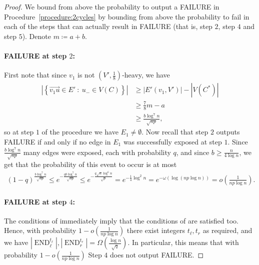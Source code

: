 \documentclass{article}
\DeclareMathOperator{\END}{END}
\begin{document}
	\begin{proof}
		We bound from above the probability to output a FAILURE in Procedure~\ref{procedure:2cycles} by bounding from above the probability to fail in each of the steps that can actually result in  FAILURE (that is, step $2$, step $4$ and step $5$).
		Denote $m \coloneqq a+b$.
		
		\paragraph*{FAILURE at step $2$:} First note that since $v_1$ is not $\left(V', \frac{1}{8} \right)$-heavy, we have
		\begin{align*}
		\left|\left\{\overrightarrow{v_1u} \in E' ~:~ u_- \in V(C) \right\} \right| &\ge \left|E'(v_1, V') \right| - \left|V(C^*) \right| \\
		&\ge \tfrac{7}{8}m - a\\
		&\ge \tfrac{b \log^7 n}{\sqrt{np}},
		\end{align*}
		so at step $1$ of the procedure we have $E_1 \neq \emptyset$.
		Now recall that step $2$ outputs FAILURE if and only if no edge in $E_1$ was successfully exposed at step $1$.
		Since $\frac{b \log^7 n}{\sqrt{np}}$ many edges were exposed, each with probability $q$, and since $b \ge \frac{n}{4\log n}$, we get that the probability of this event to occur is at most
		\begin{align*}
		(1-q)^{\frac{b\log^7 n}{\sqrt{np}}} \le e^{-\frac{qb \log^7 n}{\sqrt{np}}} \le e^{-\frac{q\sqrt{n}\log^6 n}{\sqrt{p}}} = e^{-\frac{1}{4}\log^2 n} = e^{-\omega(\log(np\log n))} = o\left(\tfrac{1}{np\log n} \right).
		\end{align*}	
		
		\paragraph*{FAILURE at step $4$:} The conditions of  immediately imply that the conditions of  are satisfied too.
		Hence, with probability $1 - o\left(\frac{1}{np\log n} \right)$ there exist integers $t_{\ell}, t_r$ as required, and we have $\left|\END_{\ell}^{t_{\ell}} \right|, \left|\END_r^{t_r} \right| = \Omega\left(\frac{\log n}{\sqrt{q}} \right)$.
		In particular, this means that with probability $1 - o\left(\frac{1}{np\log n} \right)$ Step $4$ does not output FAILURE.
		

\end{proof}
\end{document}
